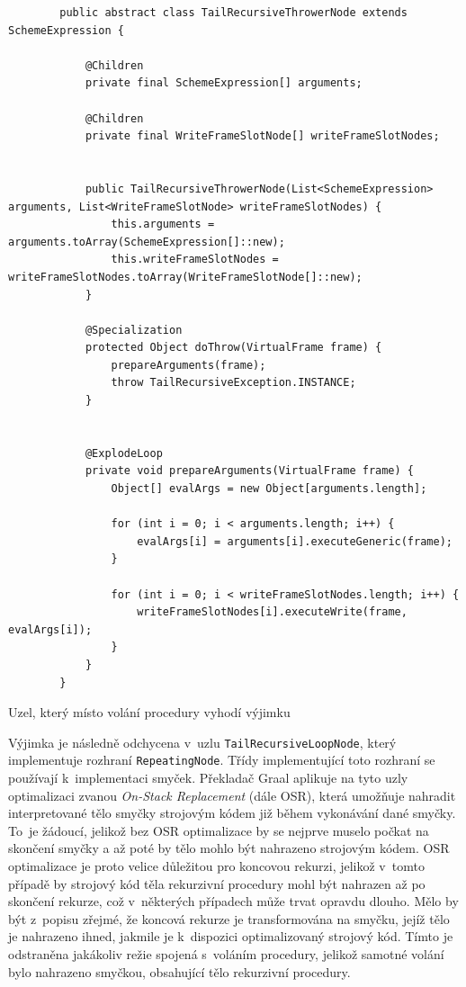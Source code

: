 \documentclass[
  master,
  biblatex,
  figures=true,
  theorems,
  sourcecodes,
  glossaries,
  index
]{kidiplom}
\begin{document}
\begin{listing} 
    \begin{verbatim}
        public abstract class TailRecursiveThrowerNode extends SchemeExpression {
        
            @Children
            private final SchemeExpression[] arguments;
        
            @Children
            private final WriteFrameSlotNode[] writeFrameSlotNodes;
        
        
            public TailRecursiveThrowerNode(List<SchemeExpression> arguments, List<WriteFrameSlotNode> writeFrameSlotNodes) {
                this.arguments = arguments.toArray(SchemeExpression[]::new);
                this.writeFrameSlotNodes = writeFrameSlotNodes.toArray(WriteFrameSlotNode[]::new);
            }
        
            @Specialization
            protected Object doThrow(VirtualFrame frame) {
                prepareArguments(frame);
                throw TailRecursiveException.INSTANCE;
            }
        
        
            @ExplodeLoop
            private void prepareArguments(VirtualFrame frame) {
                Object[] evalArgs = new Object[arguments.length];
        
                for (int i = 0; i < arguments.length; i++) {
                    evalArgs[i] = arguments[i].executeGeneric(frame);
                }
        
                for (int i = 0; i < writeFrameSlotNodes.length; i++) {
                    writeFrameSlotNodes[i].executeWrite(frame, evalArgs[i]);
                }
            }
        }
    \end{verbatim}
    \caption{Uzel, který místo volání procedury vyhodí výjimku}
    \label{TailRecursiveThrowerNode}
\end{listing}



Výjimka je následně odchycena v~uzlu \texttt{TailRecursiveLoopNode}, který implementuje rozhraní \texttt{RepeatingNode}. Třídy implementující toto rozhraní se používají k~implementaci smyček. Překladač Graal aplikuje na tyto uzly optimalizaci zvanou \textit{On-Stack Replacement} (dále OSR), která umožňuje nahradit interpretované tělo smyčky strojovým kódem již během vykonávání dané smyčky. To~je žádoucí, jelikož bez OSR optimalizace by se nejprve muselo počkat na skončení smyčky a až poté by tělo mohlo být nahrazeno strojovým kódem. OSR optimalizace je proto velice důležitou pro koncovou rekurzi, jelikož v~tomto případě by strojový kód těla rekurzivní procedury mohl být nahrazen až po skončení rekurze, což v~některých případech může trvat opravdu dlouho. Mělo by být z~popisu zřejmé, že koncová rekurze je transformována na smyčku, jejíž tělo je nahrazeno ihned, jakmile je k~dispozici optimalizovaný strojový kód. Tímto je odstraněna jakákoliv režie spojená s~voláním procedury, jelikož samotné volání bylo nahrazeno smyčkou, obsahující tělo rekurzivní procedury.  
 
\end{document}

